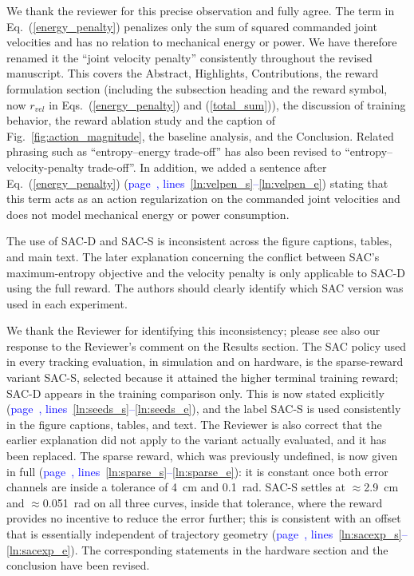 \documentclass[11pt]{elsarticle}
\newcommand{\mlines}[2]{\textcolor{blue}{page~\pageref{#1}, lines~\ref{#1}--\ref{#2}}}
\begin{document}
\begin{responsebox}
We thank the reviewer for this precise observation and fully agree. The term in Eq.~(\ref{energy_penalty}) penalizes only the sum of squared commanded joint velocities and has no relation to mechanical energy or power. We have therefore renamed it the ``joint velocity penalty'' consistently throughout the revised manuscript. This covers the Abstract, Highlights, Contributions, the reward formulation section (including the subsection heading and the reward symbol, now $r_{vel}$ in Eqs.~(\ref{energy_penalty}) and (\ref{total_sum})), the discussion of training behavior, the reward ablation study and the caption of Fig.~\ref{fig:action_magnitude}, the baseline analysis, and the Conclusion. Related phrasing such as ``entropy--energy trade-off'' has also been revised to ``entropy--velocity-penalty trade-off''. In addition, we added a sentence after Eq.~(\ref{energy_penalty}) (\mlines{ln:velpen_s}{ln:velpen_e}) stating that this term acts as an action regularization on the commanded joint velocities and does not model mechanical energy or power consumption.
\end{responsebox}

\begin{reviewerbox}[Comment R1.5]
The use of SAC-D and SAC-S is inconsistent across the figure captions, tables, and main text. The later explanation concerning the conflict between SAC's maximum-entropy objective and the velocity penalty is only applicable to SAC-D using the full reward. The authors should clearly identify which SAC version was used in each experiment.
\end{reviewerbox}

\begin{responsebox}
We thank the Reviewer for identifying this inconsistency; please see also our response to the Reviewer's comment on the Results section. The SAC policy used in every tracking evaluation, in simulation and on hardware, is the sparse-reward variant SAC-S, selected because it attained the higher terminal training reward; SAC-D appears in the training comparison only. This is now stated explicitly (\mlines{ln:seeds_s}{ln:seeds_e}), and the label SAC-S is used consistently in the figure captions, tables, and text. The Reviewer is also correct that the earlier explanation did not apply to the variant actually evaluated, and it has been replaced. The sparse reward, which was previously undefined, is now given in full (\mlines{ln:sparse_s}{ln:sparse_e}): it is constant once both error channels are inside a tolerance of 4~cm and 0.1~rad. SAC-S settles at $\approx$2.9~cm and $\approx$0.051~rad on all three curves, inside that tolerance, where the reward provides no incentive to reduce the error further; this is consistent with an offset that is essentially independent of trajectory geometry (\mlines{ln:sacexp_s}{ln:sacexp_e}). The corresponding statements in the hardware section and the conclusion have been revised.
\end{responsebox}
\end{document}

